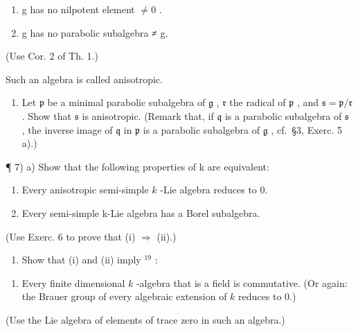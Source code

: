 \begin{enumerate}
\def\labelenumi{(\roman{enumi})}
\item
  g has no nilpotent element \(\neq 0\) .
\item
  g has no parabolic subalgebra ≠ g.
\end{enumerate}

(Use Cor. 2 of Th. 1.)

Such an algebra is called anisotropic.

\begin{enumerate}
\def\labelenumi{\alph{enumi})}
\setcounter{enumi}{1}
\tightlist
\item
  Let \(\mathfrak{p}\) be a minimal parabolic subalgebra of \(\mathfrak{g}\) , \(\mathfrak{r}\) the radical of \(\mathfrak{p}\) , and \(\mathfrak{s} = \mathfrak{p} / \mathfrak{r}\) . Show that \(\mathfrak{s}\) is anisotropic. (Remark that, if \(\mathfrak{q}\) is a parabolic subalgebra of \(\mathfrak{s}\) , the inverse image of \(\mathfrak{q}\) in \(\mathfrak{p}\) is a parabolic subalgebra of \(\mathfrak{g}\) , cf.~§3, Exerc. 5 a).)
\end{enumerate}

¶ 7) a) Show that the following properties of k are equivalent:

\begin{enumerate}
\def\labelenumi{(\roman{enumi})}
\item
  Every anisotropic semi-simple \(k\) -Lie algebra reduces to 0.
\item
  Every semi-simple k-Lie algebra has a Borel subalgebra.
\end{enumerate}

(Use Exerc. 6 to prove that (i) \(\Longrightarrow\) (ii).)

\begin{enumerate}
\def\labelenumi{\alph{enumi})}
\setcounter{enumi}{1}
\tightlist
\item
  Show that (i) and (ii) imply \(^{19}\) :
\end{enumerate}

\begin{enumerate}
\def\labelenumi{(\roman{enumi})}
\setcounter{enumi}{2}
\tightlist
\item
  Every finite dimensional \(k\) -algebra that is a field is commutative. (Or again: the Brauer group of every algebraic extension of \(k\) reduces to 0.)
\end{enumerate}

(Use the Lie algebra of elements of trace zero in such an algebra.)

